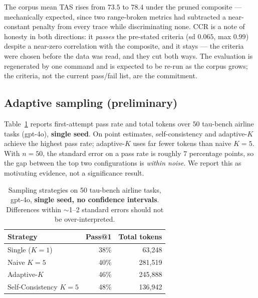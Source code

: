 \documentclass[11pt]{article}
\begin{document}
The corpus mean TAS rises from $73.5$ to $78.4$ under the pruned composite ---
mechanically expected, since two range-broken metrics had subtracted a
near-constant penalty from every trace while discriminating none. CCR is a
note of honesty in both directions: it \emph{passes} the pre-stated criteria
(sd $0.065$, max $0.99$) despite a near-zero correlation with the composite,
and it stays --- the criteria were chosen before the data was read, and they
cut both ways. The evaluation is regenerated by one command and is expected
to be re-run as the corpus grows; the criteria, not the current pass/fail
list, are the commitment.

\subsection{Adaptive sampling (preliminary)}
Table~\ref{tab:sampling} reports first-attempt pass rate and total tokens over
$50$ tau-bench airline tasks (gpt-4o), \textbf{single seed}. On point estimates,
self-consistency and adaptive-$K$ achieve the highest pass rate; adaptive-$K$
uses far fewer tokens than naive $K{=}5$. With $n=50$, the standard error on a
pass rate is roughly $7$ percentage points, so the gap between the top two
configurations is \emph{within noise}. We report this as motivating evidence,
not a significance result.

\begin{table}[t]
\centering
\caption{Sampling strategies on 50 tau-bench airline tasks, gpt-4o,
\textbf{single seed, no confidence intervals}. Differences within $\sim$1--2
standard errors should not be over-interpreted.}
\label{tab:sampling}
\begin{tabular}{lrr}
\toprule
Strategy & Pass@1 & Total tokens \\
\midrule
Single ($K{=}1$)        & 38\% & \phantom{0}63{,}248 \\
Naive $K{=}5$           & 40\% & 281{,}519 \\
Adaptive-$K$            & 46\% & 245{,}888 \\
Self-Consistency $K{=}5$ & 48\% & 136{,}942 \\
\bottomrule
\end{tabular}
\end{table}
\end{document}
